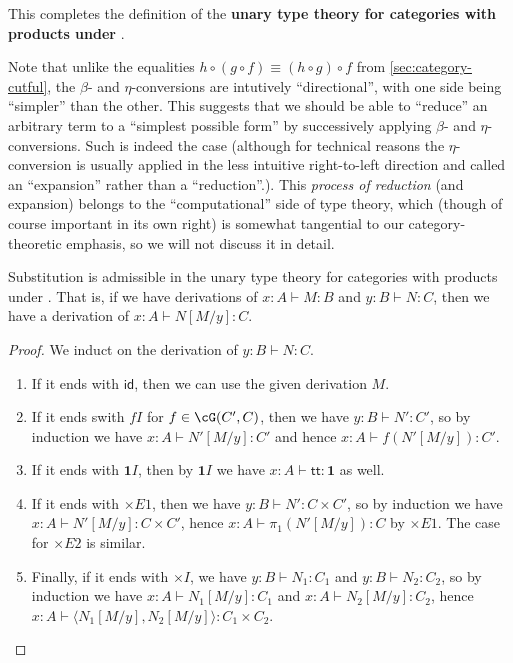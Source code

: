 \documentclass{book}
\def\idfunc{\mathsf{id}}
\let\types\vdash
\def\unit{\mathbf{1}}
\def\ttt{\mathsf{tt}}
\def\timesE{\ensuremath{\mathord{\times}E}}
\def\timesI{\ensuremath{\mathord{\times}I}}
\def\pair#1#2{\langle #1,#2\rangle}
\begin{document}
This completes the definition of the \textbf{unary type theory for categories with products under \cG}.

\begin{rmk}\label{rmk:beta-reduction}
  Note that unlike the equalities $h\circ (g\circ f) \equiv (h\circ g)\circ f$ from \cref{sec:category-cutful}, the $\beta$- and $\eta$-conversions are intutively ``directional'', with one side being ``simpler'' than the other.
  This suggests that we should be able to ``reduce'' an arbitrary term to a ``simplest possible form'' by successively applying $\beta$- and $\eta$-conversions.
  Such is indeed the case (although for technical reasons the $\eta$-conversion is usually applied in the less intuitive right-to-left direction and called an ``expansion'' rather than a ``reduction''.).
  This \emph{process of reduction} (and expansion) belongs to the ``computational'' side of type theory, which (though of course important in its own right) is somewhat tangential to our category-theoretic emphasis, so we will not discuss it in detail.
\end{rmk}

\begin{thm}\label{thm:catprod-subadm}
  Substitution is admissible in the unary type theory for categories with products under \cG.
  That is, if we have derivations of $x:A\types M:B$ and $y:B \types N:C$, then we have a derivation of $x:A \types N[M/y]:C$.
\end{thm}
\begin{proof}
  We induct on the derivation of $y:B \types N:C$.
  \begin{enumerate}
  \item If it ends with $\idfunc$, then we can use the given derivation $M$.
  \item If it ends swith $fI$ for $f\in \cG(C',C)$, then we have $y:B \types N':C'$, so by induction we have $x:A\types N'[M/y]:C'$ and hence $x:A\types f(N'[M/y]):C'$.
  \item If it ends with $\unit I$, then by $\unit I$ we have $x:A \types \ttt:\unit$ as well.
  \item If it ends with $\timesE1$, then we have $y:B\types N':C\times C'$, so by induction we have $x:A \types N'[M/y]:C\times C'$, hence $x:A \types \pi_1(N'[M/y]):C$ by $\timesE1$.
    The case for $\timesE2$ is similar.
  \item Finally, if it ends with $\timesI$, we have $y:B\types N_1:C_1$ and $y:B\types N_2:C_2$, so by induction we have $x:A \types N_1[M/y]:C_1$ and $x:A \types N_2[M/y]:C_2$, hence $x:A \types \pair{N_1[M/y]}{N_2[M/y]}:C_1\times C_2$.\qedhere
  \end{enumerate}
\end{proof}
\end{document}
